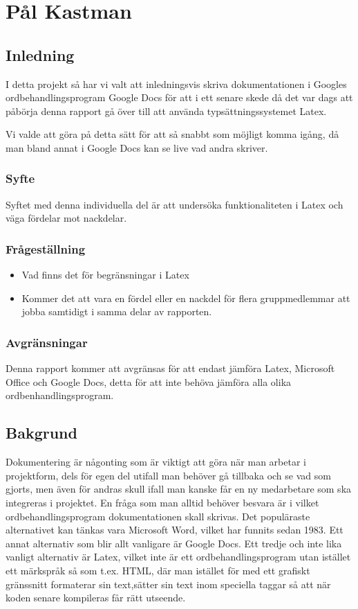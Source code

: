 \section{Pål Kastman}
\subsection{Inledning}
I detta projekt så har vi valt att inledningsvis skriva dokumentationen i Googles ordbehandlingsprogram Google Docs för att 
i ett senare skede då det var dags att påbörja denna rapport gå över till att använda typsättningssystemet Latex. 

Vi valde att göra på detta sätt för att så snabbt som möjligt komma igång, då man bland annat i Google Docs kan se live 
vad andra skriver.

\subsubsection{Syfte}
Syftet med denna individuella del är att undersöka funktionaliteten i Latex och väga fördelar mot nackdelar.

\subsubsection{Frågeställning}
\begin{itemize}
\item Vad finns det för begränsningar i Latex
\item Kommer det att vara en fördel eller en nackdel för flera gruppmedlemmar att jobba samtidigt i samma delar av rapporten.
\end{itemize}

\subsubsection{Avgränsningar}
Denna rapport kommer att avgränsas för att endast jämföra Latex, Microsoft Office och Google Docs, detta för att 
inte behöva jämföra alla olika ordbenhandlingsprogram.

\subsection{Bakgrund}
Dokumentering är någonting som är viktigt att göra när man arbetar i projektform, dels för egen del utifall man behöver 
gå tillbaka och se vad som gjorts, men även för andras skull ifall man kanske får en ny medarbetare som ska integreras i 
projektet. En fråga som man alltid behöver besvara är i vilket ordbehandlingsprogram dokumentationen skall skrivas. Det populäraste 
alternativet kan tänkas vara Microsoft Word, vilket har funnits sedan 1983\cite{word_ursprung}.
\newline
Ett annat alternativ som blir allt vanligare är Google Docs.
\newline
Ett tredje och inte lika vanligt alternativ är Latex, vilket inte är ett ordbehandlingsprogram utan istället ett märkspråk
 så som t.ex. HTML, där man istället för med ett grafiskt gränssnitt formaterar sin text,sätter sin text inom speciella taggar så att när koden senare kompileras får rätt utseende.

